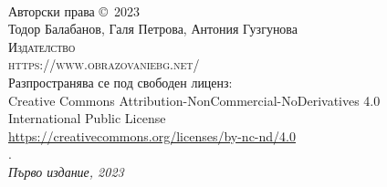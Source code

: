 ~\vfill
\thispagestyle{empty}

\noindent Авторски права \copyright\ 2023 \\

\noindent Тодор Балабанов, Галя Петрова, Антония Гузгунова \\ 

\noindent \textsc{Издателство } \\
\noindent \textsc{https://www.obrazovaniebg.net/} \\

\noindent Разпространява се под свободен лиценз: \\ 
Creative Commons Attribution-NonCommercial-NoDerivatives 4.0 \\
International Public License \\
\url{https://creativecommons.org/licenses/by-nc-nd/4.0} \\

. \\

\noindent \textit{Първо издание, 2023}

